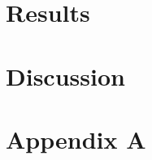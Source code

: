 \documentclass[twoside]{article}
\begin{document}
\begin{multicols}{2}

\section{Results}



\section{Discussion}




{}


\section*{Appendix A}


\end{multicols}
\end{document}
